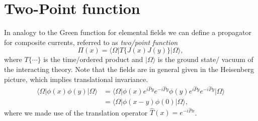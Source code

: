 \documentclass[../../index.tex]{subfiles}
\begin{document}
\section{Two-Point function}
\label{sec:twoPointFunction}
In analogy to the Green function for elemental fields we can define a
propagator for composite currents, referred to as \textit{two\-/point function}
\begin{equation}
  \Pi(x) = \langle\Omega\vert T\{J(x)J(y)\} \vert\Omega\rangle,
\end{equation}
where $T\{\cdots\}$ is the time\-/ordered product and $\vert\Omega\rangle$ is
the ground state/ vacuum of the interacting theory. Note that the fields are in
general given in the Heisenberg picture, which implies translational invariance.
\begin{equation}
  \begin{split}
    \langle\Omega\vert \phi(x)\phi(y) \vert\Omega\rangle &= \langle\Omega\vert \phi(x) e^{i\hat P y}e^{-i\hat P y}\phi(y)e^{i\hat P y}e^{-i\hat P y} \vert\Omega\rangle \\
    &= \langle\Omega\vert \phi(x-y)\phi(0) \vert\Omega\rangle,
  \end{split}
\end{equation}
where we made use of the translation operator $\hat T(x) = e^{-i \hat P x}$.
\end{document}
